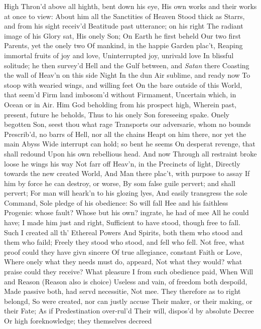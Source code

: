 \documentclass[11pt]{book}
\newcounter {first}
\begin{document}
High Thron'd above all highth, bent down his eye, 
His own works and their works at once to view: 
About him all the Sanctities of Heaven 
Stood thick as Starrs, and from his sight receiv'd 
Beatitude past utterance; on his right 
The radiant image of his Glory sat, 
His onely Son; On Earth he first beheld 
Our two first Parents, yet the onely two 
Of mankind, in the happie Garden plac't, 
Reaping immortal fruits of joy and love, 
Uninterrupted joy, unrivald love 
In blissful solitude; he then survey'd 
Hell and the Gulf between, and \textit{Satan} there 
Coasting the wall of Heav'n on this side Night 
In the dun Air sublime, and ready now 
To stoop with wearied wings, and willing feet 
On the bare outside of this World, that seem'd 
Firm land imbosom'd without Firmament, 
Uncertain which, in Ocean or in Air. 
Him God beholding from his prospect high, 
Wherein past, present, future he beholds, 
Thus to his onely Son foreseeing spake. 
\quad Onely begotten Son, seest thou what rage 
Transports our adversarie, whom no bounds 
Prescrib'd, no barrs of Hell, nor all the chains 
Heapt on him there, nor yet the main Abyss 
Wide interrupt can hold; so bent he seems 
On desperat revenge, that shall redound 
Upon his own rebellious head.  And now 
Through all restraint broke loose he wings his way 
Not farr off Heav'n, in the Precincts of light, 
Directly towards the new created World, 
And Man there plac't, with purpose to assay 
If him by force he can destroy, or worse, 
By som false guile pervert; and shall pervert; 
For man will heark'n to his glozing lyes, 
And easily transgress the sole Command, 
Sole pledge of his obedience: So will fall 
Hee and his faithless Progenie: whose fault? 
Whose but his own? ingrate, he had of mee 
All he could have; I made him just and right, 
Sufficient to have stood, though free to fall. 
Such I created all th' Ethereal Powers 
And Spirits, both them who stood and them who faild; 
Freely they stood who stood, and fell who fell. 
Not free, what proof could they have givn sincere 
Of true allegiance, constant Faith or Love, 
Where onely what they needs must do, appeard, 
Not what they would? what praise could they receive? 
What pleasure I from such obedience paid, 
When Will and Reason (Reason also is choice) 
Useless and vain, of freedom both despoild, 
Made passive both, had servd necessitie, 
Not mee.  They therefore as to right belongd, 
So were created, nor can justly accuse 
Their maker, or their making, or their Fate; 
As if Predestination over-rul'd 
Their will, dispos'd by absolute Decree 
Or high foreknowledge; they themselves decreed 
\end{document}
